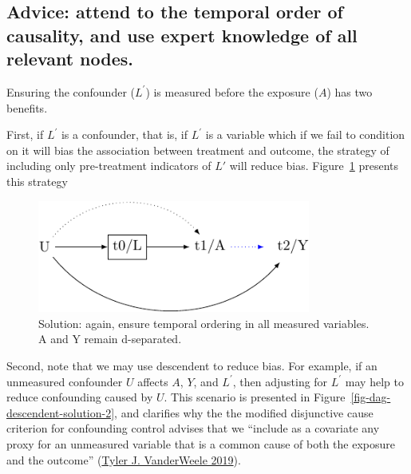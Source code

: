 \documentclass[
  singlecolumn]{report}
\begin{document}
\hypertarget{advice-attend-to-the-temporal-order-of-causality-and-use-expert-knowledge-of-all-relevant-nodes.}{%
\subsection{Advice: attend to the temporal order of causality, and use
expert knowledge of all relevant
nodes.}\label{advice-attend-to-the-temporal-order-of-causality-and-use-expert-knowledge-of-all-relevant-nodes.}}

Ensuring the confounder (\(L^\prime\)) is measured before the exposure
(\(A\)) has two benefits.

First, if \(L^\prime\) is a confounder, that is, if \(L^\prime\) is a
variable which if we fail to condition on it will bias the association
between treatment and outcome, the strategy of including only
pre-treatment indicators of \(L\prime\) will reduce bias.
Figure~\ref{fig-dag-descendent-solution} presents this strategy

\begin{figure}

{\centering \includegraphics[width=0.8\textwidth,height=\textheight]{causal-dags_files/figure-pdf/fig-dag-descendent-solution-1.pdf}

}

\caption{\label{fig-dag-descendent-solution}Solution: again, ensure
temporal ordering in all measured variables. A and Y remain
d-separated.}

\end{figure}

Second, note that we may use descendent to reduce bias. For example, if
an unmeasured confounder \(U\) affects \(A\), \(Y\), and \(L^\prime\),
then adjusting for \(L^\prime\) may help to reduce confounding caused by
\(U\). This scenario is presented in
Figure~\ref{fig-dag-descendent-solution-2}, and clarifies why the the
modified disjunctive cause criterion for confounding control advises
that we ``include as a covariate any proxy for an unmeasured variable
that is a common cause of both the exposure and the outcome''
(\protect\hyperlink{ref-vanderweele2019a}{Tyler J. VanderWeele 2019}).
\end{document}
